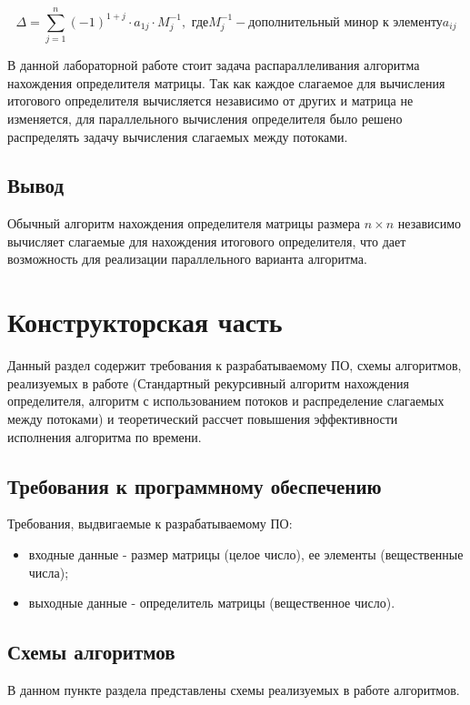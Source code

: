 \documentclass[12pt]{report}
\begin{document}
    \begin{equation}
        \label{eq:det_nxn}
        \Delta =
        \sum\limits_{j = 1}^{n} (-1)^{1 + j} \cdot a_{1j} \cdot M_{j}^{-1}
        , \text{ где} M_{j}^{-1} - \text{дополнительный минор к элементу} a_{ij}
    \end{equation}

    В данной лабораторной работе стоит задача распараллеливания алгоритма нахождения определителя матрицы.
    Так как каждое слагаемое для вычисления итогового определителя
    вычисляется независимо от других и матрица не изменяется, для параллельного вычисления определителя
    было решено распределять задачу вычисления слагаемых между потоками.


    \section{Вывод}
    Обычный алгоритм нахождения определителя матрицы размера $n \times n$ независимо вычисляет слагаемые
    для нахождения итогового определителя, что дает возможность для реализации параллельного варианта алгоритма.
    \newpage


    \chapter{Конструкторская часть}
    Данный раздел содержит требования к разрабатываемому ПО,
    схемы алгоритмов, реализуемых в работе
    (Стандартный рекурсивный алгоритм нахождения определителя,
    алгоритм с использованием потоков и распределение слагаемых между потоками)
    и теоретический рассчет повышения эффективности исполнения алгоритма по времени.


    \section{Требования к программному обеспечению}
    Требования, выдвигаемые к разрабатываемому ПО:
    \begin{itemize}
        \item входные данные - размер матрицы (целое число), ее элементы (вещественные числа);
        \item выходные данные - определитель матрицы (вещественное число).
    \end{itemize}


    \section{Схемы алгоритмов}
    В данном пункте раздела представлены схемы реализуемых в работе алгоритмов.
\end{document}
